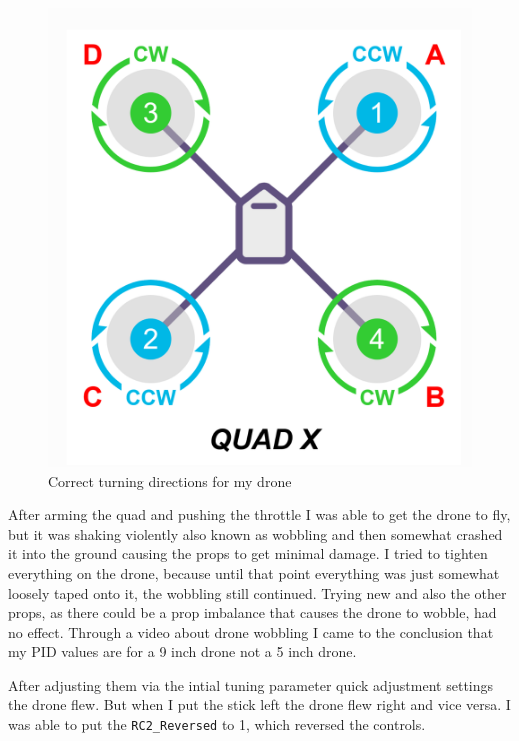 \documentclass{article}
\begin{document}
\begin{figure}[h]
	\centering
	\includegraphics[scale=0.4]{pictures/quadx}
	\caption{Correct turning directions for my drone}
	\label{fig:quadx}
\end{figure}

	After arming the quad and pushing the throttle I was able to get the drone to fly, but it was shaking violently also known as wobbling and then somewhat crashed it into the ground causing the props to get minimal damage. I tried to tighten everything on the drone, because until that point everything was just somewhat loosely taped onto it, the wobbling still continued. Trying new and also the other props, as there could be a prop imbalance that causes the drone to wobble, had no effect. Through a video\cite{dronewobblevideo} about drone wobbling I came to the conclusion that my \gls{PID} values are for a 9 inch drone not a 5 inch drone. 
	\begin{Explanation}
		
	\end{Explanation}
	After adjusting them via the intial tuning parameter quick adjustment settings the drone flew. But when I put the stick left the drone flew right and vice versa. I was able to put the \lstinline|RC2_Reversed| to 1, which reversed the controls. 
	
\end{document}

